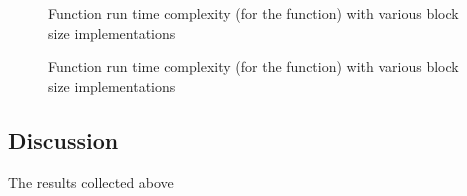 \begin{figure}
    \centering
    \begin{minipage}{\textwidth}
        \centering
        
        \caption[Function run time complexity with various block size
            implementations (linear)]{Function run time complexity (for the
             function) with various block
            size implementations}
        \label{profiling:blockSize:functionRunTimeComplexity:linear}
    \end{minipage}
    \begin{minipage}{\textwidth}
       \centering
        
        \caption[Function run time complexity with various block size
            implementations (logarithmic)]{Function run time complexity (for the
             function) with various block
            size implementations}
        \label{profiling:blockSize:functionRunTimeComplexity:logarithmic}
    \end{minipage}
\end{figure}

\subsection{Discussion}
\label{algorithmPerformance:discussion}
The results collected above

